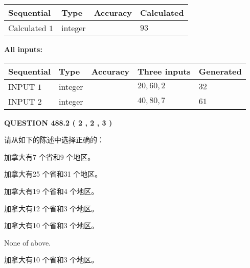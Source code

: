 \documentclass{ctexart}
\begin{document}
  
\noindent\begin{tabular}{|l|l|l|l|}
\hline
 Sequential & Type & Accuracy & Calculated \\ 
\hline
 
 
  Calculated $  1 $ & integer &  & 
  $ 93 $ 
 \\  \hline  
 \end{tabular}
   
   
   
   
\noindent\vspace{0.1in}\hspace{-0.08in} {\textbf{\Large{All inputs: }}}
   
   
  
  
\noindent\begin{tabular}{|l|l|l|l|l|}
\hline
 Sequential & Type & Accuracy & Three inputs & Generated \\ 
\hline
 
 
  INPUT $  1 $ & integer &  & $
 20
 , 
 60
 , 
 2
 $ & $ 32 $ 
 \\  \hline  
 
 
  INPUT $  2 $ & integer &  & $
 40
 , 
 80
 , 
 7
 $ & $ 61 $ 
 \\  \hline  
 \end{tabular}
   
   
  
\vspace{0.2in}
  
{\textbf{\Large{QUESTION
488.2 
 ( 2 , 2 , 3 )
}}}
  
  
请从如下的陈述中选择正确的：
 
 
加拿大有7 个省和9 个地区。
 
 
加拿大有25 个省和31 个地区。
 
 
加拿大有19 个省和4 个地区。
 
 
加拿大有12 个省和3 个地区。
 
 
加拿大有10 个省和3 个地区。
 
 
 None of above.
 
 
\noindent{}
 
 
加拿大有10 个省和3 个地区。
 
 
\noindent{}
 
\end{document}
